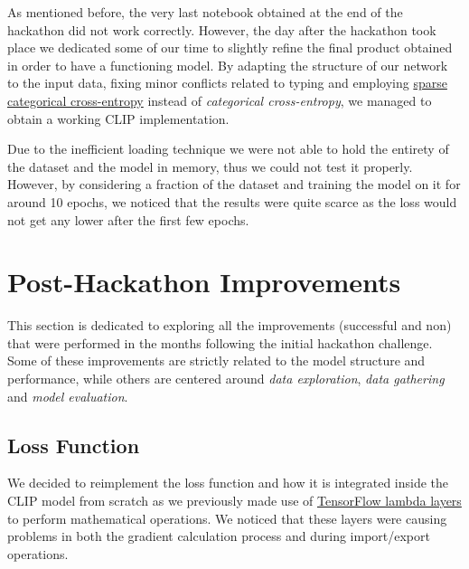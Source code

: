 \documentclass[10pt,twocolumn,letterpaper]{article}
\begin{document}

As mentioned before, the very last notebook obtained at the end of the hackathon did not work correctly.
However, the day after the hackathon took place we dedicated some of our time to slightly refine the final product obtained in order to have a functioning model.
By adapting the structure of our network to the input data, fixing minor conflicts related to typing and employing \href{https://www.tensorflow.org/api_docs/python/tf/keras/losses/SparseCategoricalCrossentropy}{sparse categorical cross-entropy} instead of \textit{categorical cross-entropy}, we managed to obtain a working CLIP implementation.

Due to the inefficient loading technique we were not able to hold the entirety of the dataset and the model in memory, thus we could not test it properly.
However, by considering a fraction of the dataset and training the model on it for around 10 epochs, we noticed that the results were quite scarce as the loss would not get any lower after the first few epochs.



\section{Post-Hackathon Improvements}
This section is dedicated to exploring all the improvements (successful and non) that were performed in the months following the initial hackathon challenge.
Some of these improvements are strictly related to the model structure and performance, while others are centered around \textit{data exploration}, \textit{data gathering} and \textit{model evaluation}.

\subsection{Loss Function}
We decided to reimplement the loss function and how it is integrated inside the CLIP model from scratch as we previously made use of \href{https://www.tensorflow.org/api_docs/python/tf/keras/layers/Lambda}{TensorFlow lambda layers} to perform mathematical operations.
We noticed that these layers were causing problems in both the gradient calculation process and during import/export operations.
\end{document}
